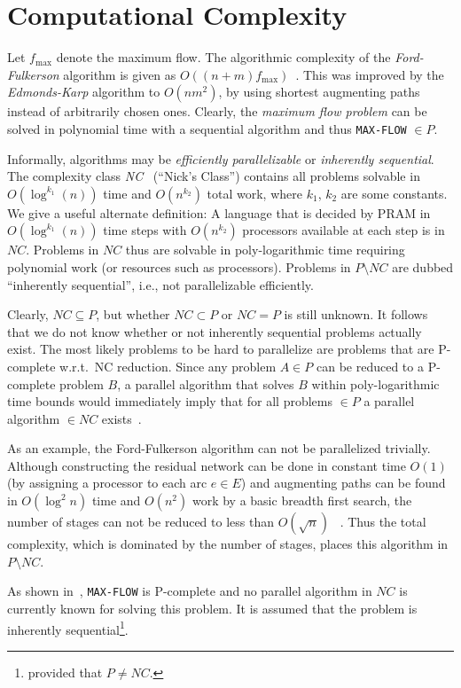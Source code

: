 \documentclass[a4paper,10pt, twocolumn]{article}
\begin{document}
\section{Computational Complexity}
\label{sec:cc}
Let $f_{\mathrm{max}}$ denote the maximum flow. The algorithmic complexity of the \emph{Ford-Fulkerson} algorithm is given as $O((n+m)f_{\mathrm{max}})$~\cite{ahuja93,papa95}. This was improved by the \emph{Edmonds-Karp} algorithm to $O(nm^2)$, by using shortest augmenting paths instead of arbitrarily chosen ones. Clearly, the \emph{maximum flow problem} can be solved in polynomial time with a sequential algorithm and thus \lstinline|MAX-FLOW| $\in P$.

Informally, algorithms may be \emph{efficiently parallelizable} or \emph{inherently sequential}. The complexity class \textit{NC}~\cite{papa95} (``Nick's Class'') contains all problems solvable in $O(\log^{k_1}(n))$ time and $O(n^{k_2})$ total work, where $k_1$, $k_2$ are some constants. We give a useful alternate definition:  A language that is decided by PRAM in $O(\log^{k_1}(n))$ time steps with $O(n^{k_2})$ processors available at each step is in $NC$. Problems in $NC$ thus are solvable  in poly-logarithmic time requiring polynomial work (or resources such as processors). Problems in $P \setminus NC$ are dubbed ``inherently sequential'', i.e., not parallelizable efficiently. 

Clearly, $NC \subseteq P$, but whether $NC \subset P$ or $NC = P$ is still unknown. It follows that we do not know whether or not inherently sequential problems actually exist. The most likely problems to be hard to parallelize are problems that are P-complete w.r.t.\ NC reduction. Since any problem $A \in P$ can be reduced to a P-complete problem $B$, a parallel algorithm that solves $B$ within poly-logarithmic time bounds would immediately imply that for all problems $\in P$ a parallel algorithm $\in NC$ exists~\cite{papa95}.

As an example, the Ford-Fulkerson algorithm can not be parallelized trivially. Although constructing the residual network can be done in constant time $O(1)$ (by assigning a processor to each arc $e \in E$) and augmenting paths can be found in $O(\log^{2}n)$ time and $O(n^{2})$ work by a basic breadth first search, the number of stages can not be reduced to less than $O(\sqrt{n})$ ~\cite{ahuja93}. Thus the total complexity, which is dominated by the number of stages, places this algorithm in $P \setminus NC$.
	
As shown in~\cite{Goldschlager82}, \lstinline|MAX-FLOW| is P-complete and no parallel algorithm in $NC$ is currently known for solving this problem. It is assumed that the problem is inherently sequential\footnote{provided that $P \neq NC$.}.
\end{document}
